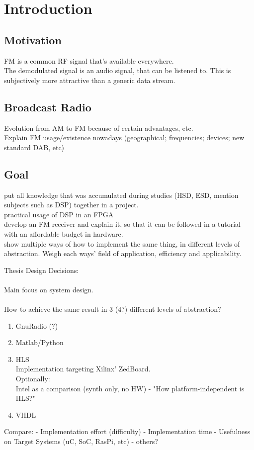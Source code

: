 \chapter{Introduction}
\label{cha:Introduction}

\section{Motivation}

FM is a common RF signal that's available everywhere.\\
The demodulated signal is an audio signal, that can be listened to. This is subjectively more attractive than a generic data stream.

\section{Broadcast Radio}
Evolution from AM to FM because of certain advantages, etc.\\
Explain FM usage/existence nowadays (geographical; frequencies; devices; new standard DAB, etc)

\section{Goal}
put all knowledge that was accumulated during studies (HSD, ESD, mention subjects such as DSP) together in a project.\\
practical usage of DSP in an FPGA\\
develop an FM receiver and explain it, so that it can be followed in a tutorial with an affordable budget in hardware.\\
show multiple ways of how to implement the same thing, in different levels of abstraction. Weigh each ways' field of application, efficiency and applicability.



Thesis Design Decisions: \\
\\
Main focus on system design. \\
\\
How to achieve the same result in 3 (4?) different levels of abstraction?

\begin{enumerate}
  \item GnuRadio (?)
  \item Matlab/Python
  \item HLS\\
      Implementation targeting Xilinx' ZedBoard.\\
      Optionally: \\
      Intel as a comparison (synth only, no HW) - "How platform-independent is HLS?"
  \item VHDL
\end{enumerate}
\vspace{.5 cm}

Compare:
- Implementation effort (difficulty)
- Implementation time
- Usefulness on Target Systems (uC, SoC, RasPi, etc)
- others?
